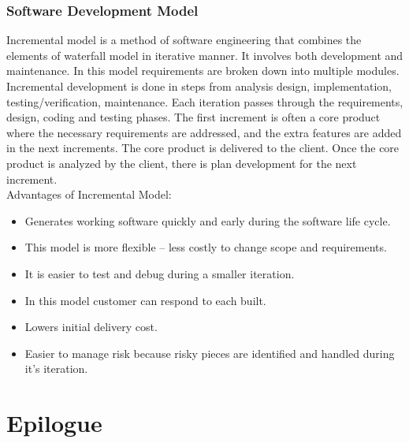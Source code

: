 \subsection{Software Development Model}
 Incremental model is a method of software engineering that combines the elements of waterfall model in iterative manner. It involves both development and maintenance. In this model requirements are broken down into multiple modules. Incremental development is done in steps from analysis design, implementation, testing/verification, maintenance. Each iteration passes through the requirements, design, coding and testing phases. The first increment is often a core product where the necessary requirements are addressed, and the extra features are added in the next increments. The core product is delivered to the client. Once the core product is analyzed by the client, there is plan development for the next increment.\\
 Advantages of Incremental Model:
 \begin{itemize}
\item Generates working software quickly and early during the software life cycle.
\item This model is more flexible – less costly to change scope and requirements.
\item It is easier to test and debug during a smaller iteration.
\item In this model customer can respond to each built.
\item Lowers initial delivery cost.
\item Easier to manage risk because risky pieces are identified and handled during it's iteration.

 \end{itemize}
 


\chapter{Epilogue}

